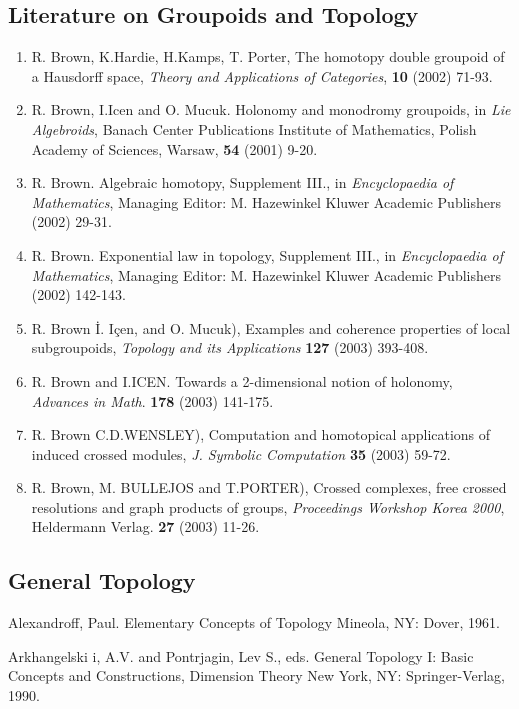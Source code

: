 \documentclass[12pt]{article}
\theoremstyle{plain}
\theoremstyle{definition}
\numberwithin{equation}{section}
\begin{document}
\subsection{Literature on Groupoids and Topology}

\begin{enumerate}
\item R. Brown, K.Hardie, H.Kamps, T. Porter, The homotopy double groupoid of a Hausdorff space, 
\emph{Theory and Applications of Categories}, {\bf 10} (2002) 71-93.
\item R. Brown, I.Icen and O. Mucuk. Holonomy and monodromy groupoids, in \emph{Lie Algebroids}, Banach Center Publications Institute of Mathematics, Polish Academy of Sciences, Warsaw, {\bf 54} (2001) 9-20. 
\item R. Brown. Algebraic homotopy, Supplement III., in \emph{Encyclopaedia of Mathematics}, Managing Editor: M. Hazewinkel Kluwer Academic Publishers (2002) 29-31.
\item R. Brown. Exponential law in topology, Supplement III., in \emph{Encyclopaedia of Mathematics}, Managing Editor: M. Hazewinkel Kluwer Academic Publishers (2002) 142-143.
\item R. Brown \.I. I\c{c}en, and O. Mucuk), Examples and coherence properties of local subgroupoids, \emph{Topology and its Applications} {\bf 127} (2003) 393-408. 
\item R. Brown and I.ICEN. Towards a 2-dimensional notion of holonomy, \emph{Advances in Math}. {\bf 178} (2003) 141-175.
\item R. Brown C.D.WENSLEY), Computation and homotopical applications of induced crossed modules, \emph{J. Symbolic Computation} {\bf 35} (2003) 59-72. 
\item R. Brown, M. BULLEJOS and T.PORTER), Crossed complexes, free crossed resolutions and graph products of groups, \emph{Proceedings Workshop Korea 2000}, Heldermann Verlag. {\bf 27} (2003) 11-26.
\end{enumerate}

\subsection{General Topology}

Alexandroff, Paul. Elementary Concepts of Topology Mineola, NY: Dover, 1961. 

Arkhangelski i, A.V. and Pontrjagin, Lev S., eds. General Topology I: Basic Concepts and Constructions, Dimension Theory New York, NY: Springer-Verlag, 1990. 
\end{document}
